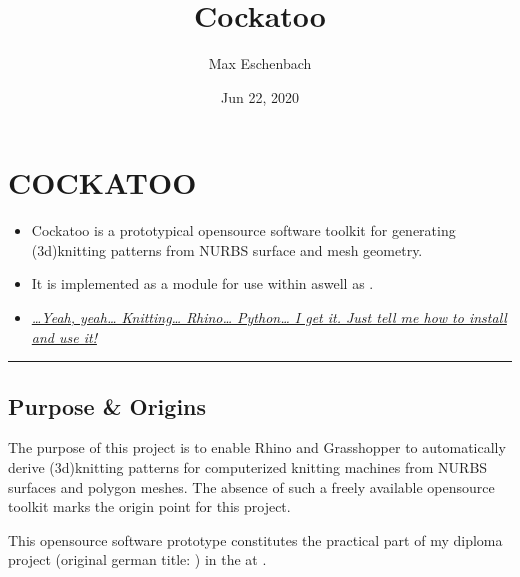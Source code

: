 \documentclass[letterpaper,10pt,english]{sphinxmanual}
\title{Cockatoo}
\date{Jun 22, 2020}
\author{Max Eschenbach}
\begin{document}
\pagestyle{empty}
\sphinxmaketitle
\pagestyle{plain}
\sphinxtableofcontents
\pagestyle{normal}
\label{\detokenize{index::doc}}



\chapter{COCKATOO}
\label{\detokenize{README:cockatoo}}\label{\detokenize{README::doc}}\begin{itemize}
\item {} 
Cockatoo is a prototypical open\sphinxhyphen{}source software toolkit for
generating (3d\sphinxhyphen{})knitting patterns from NURBS surface and mesh
geometry.

\item {} 
It is implemented as a  module
for use within 
aswell as
.

\item {} 
{\hyperref[\detokenize{README:installation--usage}]{\emph{…Yeah, yeah… Knitting… Rhino… Python… I get it. Just tell
me how to install and use it!}}}

\end{itemize}


\bigskip\hrule\bigskip



\section{Purpose \& Origins}
\label{\detokenize{README:purpose-origins}}\label{\detokenize{README:id1}}
The purpose of this project is to enable Rhino and Grasshopper to
automatically derive (3d\sphinxhyphen{})knitting patterns for computerized knitting
machines from NURBS surfaces and polygon meshes. The absence of such a
freely available open\sphinxhyphen{}source toolkit marks the origin point for this
project.

This open\sphinxhyphen{}source software prototype constitutes the practical part of my
diploma project  (original german title: ) in the  at .
\end{document}
